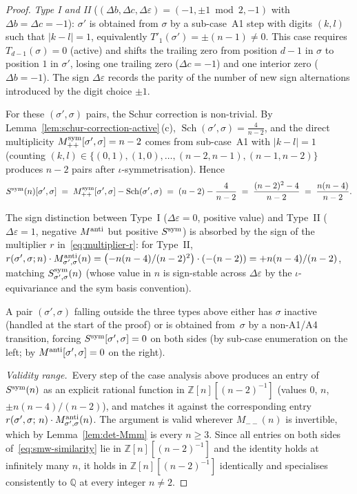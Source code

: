 \documentclass{amsart}
\theoremstyle{definition}
\theoremstyle{remark}
\begin{document}
\begin{proof}
\smallskip\noindent\emph{Type I and II}
\textup{($(\Delta b, \Delta c, \Delta \varepsilon) =
(-1, \pm 1\!\bmod 2, -1)$ with $\Delta b = \Delta c = -1$)}:
$\sigma'$ is obtained from $\sigma$ by a sub-case~A1 step with
digits $(k, l)$ such that $|k - l| = 1$, equivalently
$T'_1(\sigma') = \pm(n-1) \neq 0$.  This case requires
$T_{d-1}(\sigma) = 0$ (active) and shifts the trailing zero
from position $d-1$ in $\sigma$ to position $1$ in $\sigma'$,
losing one trailing zero ($\Delta c = -1$) and one interior
zero ($\Delta b = -1$).  The sign $\Delta \varepsilon$ records
the parity of the number of new sign alternations introduced by
the digit choice $\pm 1$.

For these $(\sigma', \sigma)$ pairs, the Schur correction is
non-trivial.  By Lemma~\ref{lem:schur-correction-active}\,(c),
$\operatorname{Sch}(\sigma', \sigma) = \tfrac{4}{n-2}$, and the direct
multiplicity $M_{++}^{\rm sym}[\sigma', \sigma] = n - 2$ comes
from sub-case~A1 with $|k - l| = 1$ (counting $(k, l) \in
\{(0, 1), (1, 0), \ldots, (n-2, n-1), (n-1, n-2)\}$ produces
$n - 2$ pairs after $\iota$-symmetrisation).  Hence
\[
  S^{\rm sym}(n)[\sigma', \sigma]
  \;=\; M_{++}^{\rm sym}[\sigma', \sigma]
       - \operatorname{Sch}(\sigma', \sigma)
  \;=\; (n - 2) - \frac{4}{n - 2}
  \;=\; \frac{(n - 2)^2 - 4}{n - 2}
  \;=\; \frac{n(n - 4)}{n - 2}.
\]

The sign distinction between Type~I ($\Delta\varepsilon = 0$,
positive value) and Type~II ($\Delta\varepsilon = 1$, negative
$M^{\rm anti}$ but positive $S^{\rm sym}$) is absorbed by the
sign of the multiplier $r$ in~\eqref{eq:multiplier-r}: for
Type~II,
$r(\sigma', \sigma; n) \cdot M^{\rm anti}_{\sigma',\sigma}(n)
 = \bigl(-n(n-4)/(n-2)^2\bigr) \cdot (-(n-2))
 = + n(n-4)/(n-2)$,
matching $S^{\rm sym}_{\sigma',\sigma}(n)$ (whose value in $n$
is sign-stable across $\Delta\varepsilon$ by the
$\iota$-equivariance and the sym basis convention).

\smallskip
A pair $(\sigma', \sigma)$ falling outside the three types
above either has $\sigma$ inactive (handled at the start of the
proof) or is obtained from~$\sigma$ by a non-A1/A4 transition,
forcing $S^{\rm sym}[\sigma', \sigma] = 0$ on both sides
(by sub-case enumeration on the left; by
$M^{\rm anti}[\sigma', \sigma] = 0$ on the right).

\smallskip\noindent\emph{Validity range.}\
Every step of the case analysis above produces an entry of
$S^{\rm sym}(n)$ as an explicit rational function in
$\mathbb Z[n][(n-2)^{-1}]$ \textup{(}values $0$, $n$,
$\pm n(n-4)/(n-2)$\textup{)}, and matches it against the
corresponding entry $r(\sigma', \sigma;\, n)\cdot
M^{\rm anti}_{\sigma',\sigma}(n)$.  The argument is valid
wherever $M_{--}(n)$ is invertible, which by
Lemma~\ref{lem:det-Mmm} is every $n \ge 3$.
Since all entries on both sides of~\eqref{eq:smw-similarity}
lie in $\mathbb Z[n][(n-2)^{-1}]$ and the identity holds at
infinitely many $n$, it holds in $\mathbb Z[n][(n-2)^{-1}]$
identically and specialises consistently to $\mathbb Q$ at
every integer $n \ne 2$.
\end{proof}
\end{document}
